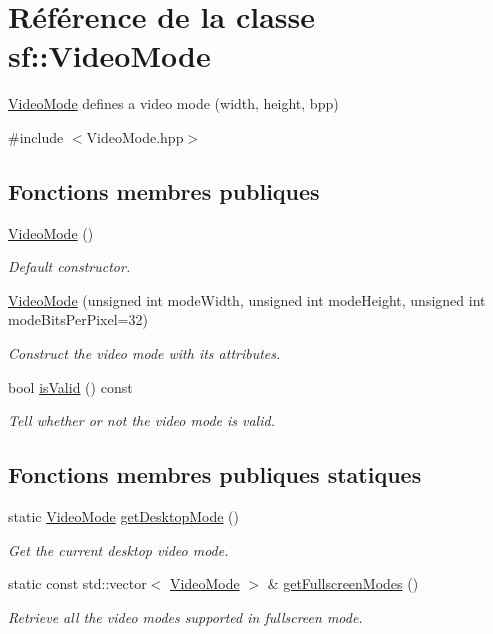 \hypertarget{classsf_1_1VideoMode}{}\section{Référence de la classe sf\+:\+:Video\+Mode}
\label{classsf_1_1VideoMode}


\hyperlink{classsf_1_1VideoMode}{Video\+Mode} defines a video mode (width, height, bpp)  




{\ttfamily \#include $<$Video\+Mode.\+hpp$>$}

\subsection*{Fonctions membres publiques}
\begin{DoxyCompactItemize}
\item 
\hyperlink{classsf_1_1VideoMode_a04c9417e5c304510bef5f6aeb03f6ce1}{Video\+Mode} ()
\begin{DoxyCompactList}\small\item\em Default constructor. \end{DoxyCompactList}\item 
\hyperlink{classsf_1_1VideoMode_a46c35ed41de9e115661dcd529d64e9d3}{Video\+Mode} (unsigned int mode\+Width, unsigned int mode\+Height, unsigned int mode\+Bits\+Per\+Pixel=32)
\begin{DoxyCompactList}\small\item\em Construct the video mode with its attributes. \end{DoxyCompactList}\item 
bool \hyperlink{classsf_1_1VideoMode_ad5e04c044b0925523c75ecb173d2129a}{is\+Valid} () const
\begin{DoxyCompactList}\small\item\em Tell whether or not the video mode is valid. \end{DoxyCompactList}\end{DoxyCompactItemize}
\subsection*{Fonctions membres publiques statiques}
\begin{DoxyCompactItemize}
\item 
static \hyperlink{classsf_1_1VideoMode}{Video\+Mode} \hyperlink{classsf_1_1VideoMode_ac1be160a4342e6eafb2cb0e8c9b18d44}{get\+Desktop\+Mode} ()
\begin{DoxyCompactList}\small\item\em Get the current desktop video mode. \end{DoxyCompactList}\item 
static const std\+::vector$<$ \hyperlink{classsf_1_1VideoMode}{Video\+Mode} $>$ \& \hyperlink{classsf_1_1VideoMode_a6815b9b3b35767d5b4563fbed4bfc67b}{get\+Fullscreen\+Modes} ()
\begin{DoxyCompactList}\small\item\em Retrieve all the video modes supported in fullscreen mode. \end{DoxyCompactList}\end{DoxyCompactItemize}
